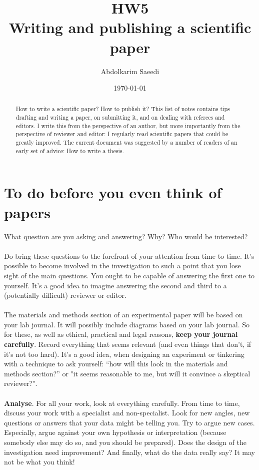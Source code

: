 \documentclass[a4paper,12pt]{article}
\begin{document}
\title{HW5 \\ Writing and publishing a scientific paper}
\author{Abdolkarim Saeedi}
\date{\today}
\maketitle
\begin{abstract}
How to write a scientific paper? How to publish it? This list of notes contains tips drafting and writing a paper, on submitting it, and on dealing with referees and editors. I write this from the perspective of an author, but more importantly from the perspective of reviewer and editor: I regularly read scientific papers that could be greatly improved. The current document was suggested by a number of readers of an early set of advice: How to write a thesis.
\end{abstract}
\newpage
\tableofcontents
\newpage
\section{To do before you even think of papers}
What question are you asking and answering? Why? Who would be interested?\\\\Do bring these questions to the forefront of your attention from time to time. It's possible to become involved in the investigation to such a point that you lose sight of the main questions. You ought to be capable of answering the first one to yourself. It's a good idea to imagine answering the second and third to a (potentially difficult) reviewer or editor.\\\\The materials and methods section of an experimental paper will be based on your lab journal. It will possibly include diagrams based on your lab journal. So for these, as well as ethical, practical and legal reasons, \textbf{keep your journal carefully}. Record everything that seems relevant (and even things that don't, if it's not too hard). It’s a good idea, when designing an experiment or tinkering with a technique to ask yourself: “how will this look in the materials and methods section?” or "it seems reasonable to me, but will it convince a skeptical reviewer?".\\\\\textbf{Analyse}. For all your work, look at everything carefully. From time to time, discuss your work with a specialist and non-specialist. Look for new angles, new questions or answers that your data might be telling you. Try to argue new cases. Especially, argue against your own hypothesis or interpretation (because somebody else may do so, and you should be prepared). Does the design of the investigation need improvement? And finally, what do the data really say? It may not be what you think!
\end{document}
